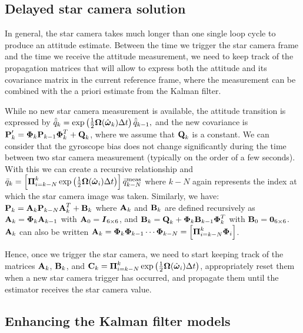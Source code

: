 \subsection{Delayed star camera solution}
\label{subsec:delayed}

In general, the star camera takes much longer than one single loop cycle to produce an attitude estimate. Between the time we trigger the star camera frame and the time we receive the attitude measurement, we need to keep track of the propagation matrices that will allow to express both the attitude and its covariance matrix in the current reference frame, where the measurement can be combined with the a priori estimate from the Kalman filter.

While no new star camera measurement is available, the attitude transition is expressed by $\hat{\bar{q}}_{k} = \exp\left(\frac{1}{2}\boldsymbol\Omega(\hat{\boldsymbol\omega}_{k})\Delta t\right)\hat{\bar{q}}_{k-1},$ and the new covariance is $\textrm{\textbf{P}}'_{k}  =  \boldsymbol{\Phi}_k \textrm{\textbf{P}}_{k-1}\boldsymbol{\Phi}^T_k + \textrm{\textbf{Q}}_k$, where we assume that $\textrm{\textbf{Q}}_k$ is a constant. We can consider that the gyroscope bias does not change significantly during the time between two star camera measurement (typically on the order of a few seconds). With this we can create a recursive relationship and $\bar{q}_{k} = \left[\boldsymbol\Pi_{i=k-N}^k\exp\left(\frac{1}{2}\boldsymbol\Omega(\hat{\boldsymbol\omega}_{i})\Delta t\right)\right]\bar{q}^{\textrm{meas}}_{k-N}$ where $k-N$ again represents the index at which the star camera image was taken. Similarly, we have: $\textrm{\textbf{P}}_{k} = \textrm{\textbf{A}}_k\textrm{\textbf{P}}_{k-N}\textrm{\textbf{A}}_k^T + \textrm{\textbf{B}}_k$ where $\textrm{\textbf{A}}_k$ and $\textrm{\textbf{B}}_k$ are defined recursively as $\textrm{\textbf{A}}_k = \boldsymbol{\Phi}_{k}\textrm{\textbf{A}}_{k-1}$ with $\textrm{\textbf{A}}_0 = \boldsymbol{I}_{6\times 6}$, and $\textrm{\textbf{B}}_k = \textrm{\textbf{Q}}_k + \boldsymbol{\Phi}_{k}\textrm{\textbf{B}}_{k-1}\boldsymbol{\Phi}_{k}^T$ with $\textrm{\textbf{B}}_0 = \boldsymbol{0}_{6\times 6}$. $\textrm{\textbf{A}}_k$ can also be written  $\textrm{\textbf{A}}_k = \boldsymbol{\Phi}_{k}\boldsymbol{\Phi}_{k-1}\cdots\boldsymbol{\Phi}_{k-N} = \left[\boldsymbol\Pi_{i=k-N}^k\boldsymbol{\Phi}_{i}\right]$.

Hence, once we trigger the star camera, we need to start keeping track of the matrices $\textrm{\textbf{A}}_k$, $\textrm{\textbf{B}}_k$, and $\textrm{\textbf{C}}_k = \boldsymbol\Pi_{i=k-N}^k\exp\left(\frac{1}{2}\boldsymbol\Omega(\hat{\boldsymbol\omega}_{i})\Delta t\right)$, appropriately reset them when a new star camera trigger has occurred, and propagate them until the estimator receives the star camera value.

\subsection{Enhancing the Kalman filter models}
\label{subsec:enhancedKalman}

